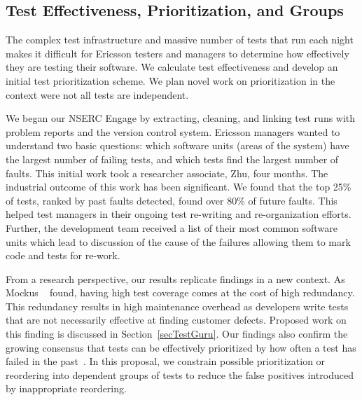 \subsection{Test Effectiveness, Prioritization, and Groups}

The complex test infrastructure and massive number of tests that run each night makes it difficult for Ericsson testers and managers to determine how effectively they are testing their software. We calculate test effectiveness and develop an initial test prioritization scheme. We plan novel work on prioritization in the context were not all tests are independent.

We began our NSERC Engage by extracting, cleaning, and linking test runs with problem reports and the version control system. Ericsson managers wanted to understand two basic questions: which software units (areas of the system) have the largest number of failing tests, and which tests find the largest number of faults. 
%
This initial work took a researcher associate, Zhu, four months. The industrial outcome of this work has been significant. We found that the top 25\% of tests, ranked by past faults detected, found over 80\% of future faults.
%
%
This helped test managers in their ongoing test re-writing and re-organization efforts. Further, the development team received a list of their most common software units which lead to discussion of the cause of the failures allowing them to mark code and tests for re-work. 

From a research perspective, our results replicate findings in a new context. As Mockus \etal~\cite{Mockus2009ESEM} found, having high test coverage comes at the cost of high redundancy. This redundancy results in high maintenance overhead as developers write tests that are not necessarily effective at finding customer defects. Proposed work on this finding is discussed in Section~\ref{secTestGuru}. Our findings also confirm the growing consensus that tests can be effectively prioritized by how often a test has failed in the past~\cite{Kim2002ICSE,Hemmati}. In this proposal, we constrain possible prioritization or reordering into dependent groups of tests to reduce the false positives introduced by inappropriate reordering.

